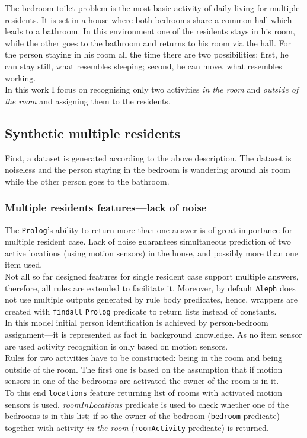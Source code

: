 \documentclass[10pt, a4paper, pdflatex, leqno, twoside, openright]{report}
\begin{document}
The bedroom-toilet problem is the most basic activity of daily living for multiple residents. It is set in a house where both bedrooms share a common hall which leads to a bathroom. In this environment one of the residents stays in his room, while the other goes to the bathroom and returns to his room via the hall. For the person staying in his room all the time there are two possibilities: first, he can stay still, what resembles sleeping; second, he can move, what resembles working.\\

In this work I focus on recognising only two activities \emph{in the room} and \emph{outside of the room} and assigning them to the residents.

    \subsection{Synthetic multiple residents}
First, a dataset is generated according to the above description. The dataset is noiseless and the person staying in the bedroom is wandering around his room while the other person goes to the bathroom.

      \subsubsection{Multiple residents features---lack of noise}
The \texttt{Prolog}'s ability to return more than one answer is of great importance for multiple resident case. Lack of noise guarantees simultaneous prediction of two active locations (using motion sensors) in the house, and possibly more than one item used.\\
Not all so far designed features for single resident case support multiple answers, therefore, all rules are extended to facilitate it. Moreover, by default \texttt{Aleph} does not use multiple outputs generated by rule body predicates, hence, wrappers are created with \texttt{findall} \texttt{Prolog} predicate to return lists instead of constants.\\

In this model initial person identification is achieved by person-bedroom assignment---it is represented as fact in background knowledge. As no item sensor are used activity recognition is only based on motion sensors.\\

Rules for two activities have to be constructed: being in the room and being outside of the room. The first one is based on the assumption that if motion sensors in one of the bedrooms are activated the owner of the room is in it.\\
To this end \texttt{locations} feature returning list of rooms with activated motion sensors is used. \emph{roomInLocations} predicate is used to check whether one of the bedrooms is in this list; if so the owner of the bedroom (\texttt{bedroom} predicate) together with activity \emph{in the room} (\texttt{roomActivity} predicate) is returned.\\
\end{document}
